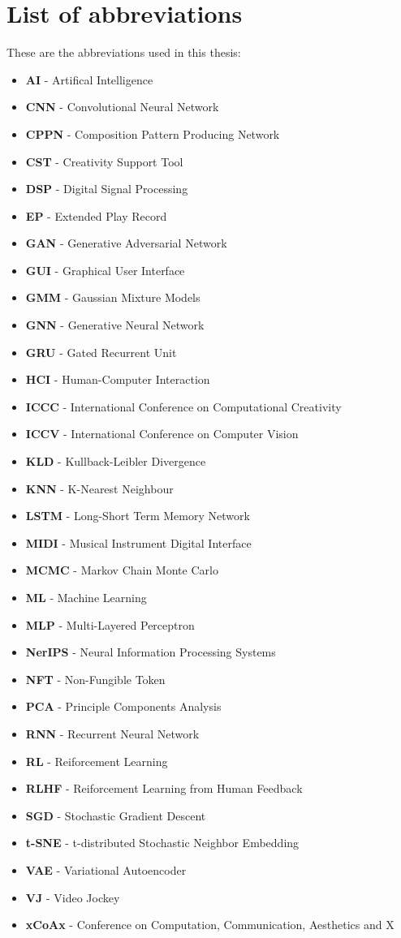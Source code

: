 \chapter*{List of abbreviations}

These are the abbreviations used in this thesis: 
\begin{itemize}
\item \textbf{AI} - Artifical Intelligence
\item \textbf{CNN} - Convolutional Neural Network
\item \textbf{CPPN} - Composition Pattern Producing Network
\item \textbf{CST} - Creativity Support Tool
\item \textbf{DSP} - Digital Signal Processing
\item \textbf{EP} - Extended Play Record
\item \textbf{GAN} - Generative Adversarial Network
\item \textbf{GUI} - Graphical User Interface
\item \textbf{GMM} - Gaussian Mixture Models
\item \textbf{GNN} - Generative Neural Network
\item \textbf{GRU} - Gated Recurrent Unit
\item \textbf{HCI} - Human-Computer Interaction
\item \textbf{ICCC} - International Conference on Computational Creativity
\item \textbf{ICCV} - International Conference on Computer Vision
\item \textbf{KLD} - Kullback-Leibler Divergence
\item \textbf{KNN} - K-Nearest Neighbour
\item \textbf{LSTM} - Long-Short Term Memory Network
\item \textbf{MIDI} - Musical Instrument Digital Interface
\item \textbf{MCMC} - Markov Chain Monte Carlo
\item \textbf{ML} - Machine Learning
\item \textbf{MLP} - Multi-Layered Perceptron
\item \textbf{NerIPS} - Neural Information Processing Systems
\item \textbf{NFT} - Non-Fungible Token
\item \textbf{PCA} - Principle Components Analysis
\item \textbf{RNN} - Recurrent Neural Network
\item \textbf{RL} - Reiforcement Learning
\item \textbf{RLHF} - Reiforcement Learning from Human Feedback
\item \textbf{SGD} - Stochastic Gradient Descent
\item \textbf{t-SNE} - t-distributed Stochastic Neighbor Embedding
\item \textbf{VAE} - Variational Autoencoder
\item \textbf{VJ} - Video Jockey
\item \textbf{xCoAx} - Conference on Computation, Communication, Aesthetics and X
\end{itemize}